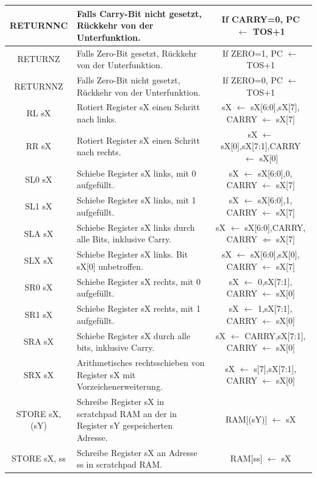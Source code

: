 \documentclass{scrartcl}
\begin{document}
\begin{longtable}{||c|p{4cm}|c||}
         RETURNNC & Falls Carry-Bit nicht gesetzt, Rückkehr von der Unterfunktion. & If CARRY=0, PC $\leftarrow$ TOS+1 \\ \hline
         RETURNZ & Falls Zero-Bit gesetzt, Rückkehr von der Unterfunktion.& If ZERO=1, PC $\leftarrow$ TOS+1 \\ \hline
         RETURNNZ & Falls Zero-Bit nicht gesetzt, Rückkehr von der Unterfunktion. & If ZERO=0, PC $\leftarrow$ TOS+1  \\ \hline
         RL sX & Rotiert Register sX einen Schritt nach links. &sX $\leftarrow$ {sX[6:0],sX[7]}, CARRY $\leftarrow$ sX[7]  \\ \hline
         RR sX & Rotiert Register sX einen Schritt nach rechts. &sX $\leftarrow$ {sX[0],sX[7:1]},CARRY $\leftarrow$ sX[0]   \\ \hline
         SL0 sX & Schiebe Register sX links, mit 0 aufgefüllt. &sX $\leftarrow$ {sX[6:0],0}, CARRY $\leftarrow$ sX[7]  \\ \hline
         SL1 sX & Schiebe Register sX links, mit 1 aufgefüllt. &sX $\leftarrow$ {sX[6:0],1}, CARRY $\leftarrow$ sX[7]  \\ \hline
         SLA sX & Schiebe Register sX links durch alle Bits, inklusive Carry. &sX $\leftarrow$ {sX[6:0],CARRY}, CARRY $\Leftarrow$ sX[7]  \\ \hline
         SLX sX & Schiebe Register sX links. Bit sX[0] unbetroffen. &sX $\leftarrow$ {sX[6:0],sX[0]}, CARRY $\leftarrow$ sX[7]  \\ \hline
         SR0 sX & Schiebe Register sX rechts, mit 0 aufgefüllt. &sX $\leftarrow$ {0,sX[7:1]}, CARRY $\leftarrow$ sX[0]  \\ \hline
         SR1 sX & Schiebe Register sX rechts, mit 1 aufgefüllt. &sX $\leftarrow$ {1,sX[7:1]}, CARRY $\leftarrow$ sX[0]  \\ \hline
         SRA sX & Schiebe Register sX durch alle bits, inklusive Carry. &sX $\leftarrow$ {CARRY,sX[7:1]}, CARRY $\leftarrow$ sX[0]  \\ \hline
         SRX sX & Arithmetisches rechtsschieben von Register sX mit Vorzeichenerweiterung. &sX $\leftarrow$ {s[7],sX[7:1]}, CARRY $\leftarrow$ sX[0]  \\ \hline
         STORE sX, (sY) & Schreibe Register sX in scratchpad RAM an der in Register sY gespeicherten Adresse. &RAM[(sY)] $\leftarrow$ sX \\ \hline
         STORE sX, ss & Schreibe Register sX an Adresse ss in scratchpad RAM. &RAM[ss] $\leftarrow$ sX \\ \hline

\end{longtable}
\end{document}
